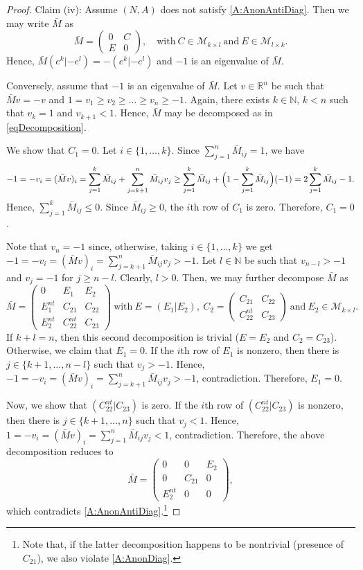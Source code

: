 \documentclass[a4paper,10pt]{article}
\theoremstyle{remark}
\newcommand{\TM}{A} %
\newcommand{\MM}{M} %
\newcommand{\MS}{\mathcal M} %
\begin{document}
\begin{proof}
Claim (iv): Assume $(N,\TM)$ does not satisfy
\ref{A:AnonAntiDiag}. Then we may write $\bar {\MM}$ as
\[
\bar {\MM}=\left(\begin{array}{c|c}0&C\\
\hline E&0\end{array}\right), \quad\mbox{with}\
C\in\MS_{k\times l}\ \mbox{and}\ E\in\MS_{l\times
k}.
\]
Hence, $\bar {\MM}(e^k|-e^l)=-(e^k|-e^l)$ and $-1$ is an eigenvalue of
$\bar {\MM}$.

Conversely, assume that $-1$ is an eigenvalue of $\bar {\MM}$. Let
$v\in \mathbb R^n$ be such that $\bar {\MM}v=-v$ and $1=v_1\geq
v_2\geq\dots\geq v_n\geq -1$. Again, there exists $k\in \mathbb
N$, $k<n$ such that $v_k=1$ and $v_{k+1}<1$. Hence, $\bar {\MM}$ may
be decomposed as in \eqref{eqDecomposition}.

We show that $C_1=0$. Let $i\in\{1,\dots,k\}$. Since
${\sum_{j=1}^n\bar {\MM}_{ij}=1}$, we have
\[
-1=-v_i=(\bar {\MM}v)_i=\sum_{j=1}^k\bar {\MM}_{ij}
+\sum_{j=k+1}^n\bar {\MM}_{ij}v_j\geq\sum_{j=1}^k\bar {\MM}_{ij}
+\Bigl(1-\sum_{j=1}^k\bar {\MM}_{ij}\Bigr)(-1)=
2\sum_{j=1}^k\bar {\MM}_{ij}-1.
\]
Hence, $\sum_{j=1}^k\bar {\MM}_{ij}\leq 0$. Since $\bar {\MM}_{ij}\geq
0$, the $i$th row of $C_1$ is zero. Therefore, $C_1=0$.

Note that $v_n=-1$ since, otherwise, taking $i\in\{1,\dots,k\}$ we
get $-1=-v_i=(\bar {\MM}v)_i=\sum_{j=k+1}^n\bar {\MM}_{ij}v_j>-1$. Let
$l\in\mathbb{N}$ be such that $v_{n-l}>-1$ and $v_j=-1$ for $j\geq
n-l$. Clearly, $l>0$. Then, we may further decompose $\bar {\MM}$ as
\[
\bar {\MM}=\left(\begin{array}{c|c|c}
0&E_1&E_2\\
\hline E_1^{nt}&C_{21}&C_{22}\\
\hline E_2^{nt}&C_{22}^{nt}&C_{23}
\end{array}\right)\
\mbox{with}\ E=\left(E_1 \vert E_2\right),\
C_2=\left(\begin{array}{c|c}C_{21}&C_{22}\\\hline
C_{22}^{nt}&C_{23}\end{array}\right)\ \mbox{and}\
E_2\in\MS_{k\times l}.
\]
If $k+l=n$, then this second decomposition is trivial ($E=E_2$ and
$C_2=C_{23}$). Otherwise, we claim that $E_1=0$. If the $i$th row
of $E_1$ is nonzero, then there is $j\in\{k+1,\dots,n-l\}$ such
that $v_j>-1$. Hence,
$-1=-v_i=(\bar {\MM}v)_i=\sum_{j=k+1}^{n}\bar {\MM}_{ij}v_j>-1$,
contradiction. Therefore, $E_1=0$.

Now, we show that $(C_{22}^{nt}\vert C_{23})$ is zero. If the
$i$th row of $(C_{22}^{nt}\vert C_{23})$ is nonzero, then there is
$j\in\{k+1,\dots,n\}$ such that $v_j<1$. Hence,
$1=-v_i=(\bar {\MM}v)_i=\sum_{j=1}^n\bar {\MM}_{ij}v_j<1$,
contradiction. Therefore, the above decomposition reduces to
\[
\bar {\MM}=\left(\begin{array}{c|c|c}
0&0&E_2\\
\hline 0&C_{21}&0\\
\hline E_2^{nt}&0&0
\end{array}\right),
\]
which contradicts \ref{A:AnonAntiDiag}.\footnote{Note that, if the
latter decomposition happens to be nontrivial (presence of
$C_{21}$), we also violate \ref{A:AnonDiag}.}
\end{proof}
\end{document}
